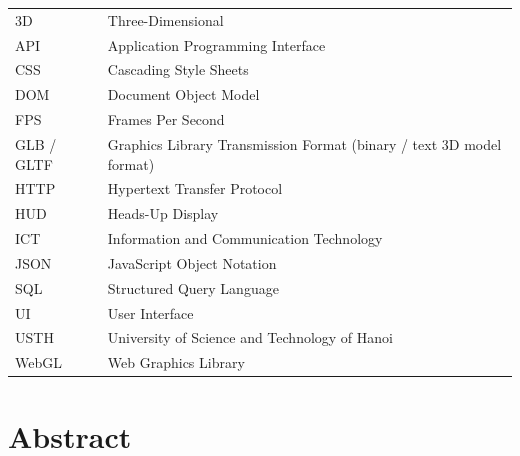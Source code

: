 \documentclass[12pt,a4paper]{report}
\begin{document}
\begin{center}
\begin{tabular}{p{2.8cm}p{10.5cm}}
3D         & Three-Dimensional \\
API        & Application Programming Interface \\
CSS        & Cascading Style Sheets \\
DOM        & Document Object Model \\
FPS        & Frames Per Second \\
GLB / GLTF & Graphics Library Transmission Format (binary / text 3D model format) \\
HTTP       & Hypertext Transfer Protocol \\
HUD        & Heads-Up Display \\
ICT        & Information and Communication Technology \\
JSON       & JavaScript Object Notation \\
SQL        & Structured Query Language \\
UI         & User Interface \\
USTH       & University of Science and Technology of Hanoi \\
WebGL      & Web Graphics Library \\
\end{tabular}
\end{center}

\tableofcontents
\listoftables
\listoffigures

\chapter*{Abstract}
\end{document}
